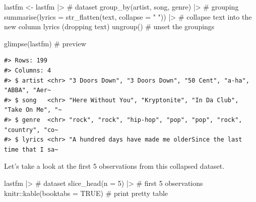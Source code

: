 \documentclass[
  letterpaper,
]{latex/krantz}
\newenvironment{Shaded}{\begin{snugshade}}{\end{snugshade}}
\newcommand{\AttributeTok}[1]{\textcolor[rgb]{0.40,0.45,0.13}{#1}}
\newcommand{\CommentTok}[1]{\textcolor[rgb]{0.37,0.37,0.37}{#1}}
\newcommand{\ConstantTok}[1]{\textcolor[rgb]{0.56,0.35,0.01}{#1}}
\newcommand{\DecValTok}[1]{\textcolor[rgb]{0.68,0.00,0.00}{#1}}
\newcommand{\FunctionTok}[1]{\textcolor[rgb]{0.28,0.35,0.67}{#1}}
\newcommand{\NormalTok}[1]{\textcolor[rgb]{0.00,0.23,0.31}{#1}}
\newcommand{\OtherTok}[1]{\textcolor[rgb]{0.00,0.23,0.31}{#1}}
\newcommand{\SpecialCharTok}[1]{\textcolor[rgb]{0.37,0.37,0.37}{#1}}
\newcommand{\StringTok}[1]{\textcolor[rgb]{0.13,0.47,0.30}{#1}}
\begin{document}
\begin{Shaded}
\begin{Highlighting}[]
\NormalTok{lastfm }\OtherTok{\textless{}{-}} 
\NormalTok{  lastfm }\SpecialCharTok{|\textgreater{}} \CommentTok{\# dataset}
  \FunctionTok{group\_by}\NormalTok{(artist, song, genre) }\SpecialCharTok{|\textgreater{}} \CommentTok{\# grouping}
  \FunctionTok{summarise}\NormalTok{(}\AttributeTok{lyrics =} \FunctionTok{str\_flatten}\NormalTok{(text, }\AttributeTok{collapse =} \StringTok{" "}\NormalTok{)) }\SpecialCharTok{|\textgreater{}}  \CommentTok{\# collapse text into the new column \textasciigrave{}lyrics\textasciigrave{} (dropping \textasciigrave{}text\textasciigrave{})}
  \FunctionTok{ungroup}\NormalTok{() }\CommentTok{\# unset the groupings}

\FunctionTok{glimpse}\NormalTok{(lastfm) }\CommentTok{\# preview}
\end{Highlighting}
\end{Shaded}

\begin{verbatim}
#> Rows: 199
#> Columns: 4
#> $ artist <chr> "3 Doors Down", "3 Doors Down", "50 Cent", "a-ha", "ABBA", "Aer~
#> $ song   <chr> "Here Without You", "Kryptonite", "In Da Club", "Take On Me", "~
#> $ genre  <chr> "rock", "rock", "hip-hop", "pop", "pop", "rock", "country", "co~
#> $ lyrics <chr> "A hundred days have made me olderSince the last time that I sa~
\end{verbatim}

Let's take a look at the first 5 observations from this collapsed
dataset.

\begin{Shaded}
\begin{Highlighting}[]
\NormalTok{lastfm }\SpecialCharTok{|\textgreater{}} \CommentTok{\# dataset}
  \FunctionTok{slice\_head}\NormalTok{(}\AttributeTok{n =} \DecValTok{5}\NormalTok{) }\SpecialCharTok{|\textgreater{}} \CommentTok{\# first 5 observations}
\NormalTok{  knitr}\SpecialCharTok{::}\FunctionTok{kable}\NormalTok{(}\AttributeTok{booktabs =} \ConstantTok{TRUE}\NormalTok{) }\CommentTok{\# print pretty table}
\end{Highlighting}
\end{Shaded}
\end{document}
